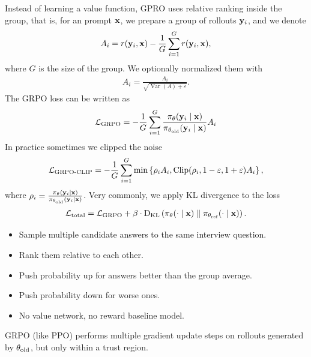 \documentclass[11pt]{article}  %
\begin{document}
Instead of learning a value function, GPRO uses relative ranking
inside the group, that is, for an prompt $\mathbf{x}$, we prepare a group of rollouts $\mathbf{y}_i$, and we denote 
\begin{align*}
  A_i = r(\mathbf{y}_i, \mathbf{x}) - \frac{1}{G}\sum_{i=1}^{G}r(\mathbf{y}_i, \mathbf{x}),
\end{align*}
where $G$ is the size of the group.
We optionally normalized them with 
\begin{align*}
  A_i = \frac{A_i}{\sqrt{\operatorname{Var}(A) + \varepsilon}}.
\end{align*}
The GRPO loss can be written as 
\begin{align*}
  \mathcal{L}_{\text{GRPO}} = -\frac{1}{G}\sum_{i=1}^{G}\frac{\pi_{\theta}(\mathbf{y}_i \mid \mathbf{x})}{\pi_{\theta_{\text{old}}}(\mathbf{y}_i \mid \mathbf{x})} A_i
\end{align*}
In practice sometimes we clipped the noise 
\begin{align*}
  \mathcal{L}_{\text{GRPO-CLIP}} = -\frac{1}{G}\sum_{i=1}^{G} \min\left\{ \rho_iA_i, \operatorname{Clip}(\rho_i, 1 - \varepsilon, 1 + \varepsilon)A_i \right\},
\end{align*}
where $\rho_i = \frac{\pi_{\theta}(\mathbf{y}_i \mid \mathbf{x})}{\pi_{\theta_{\text{old}}}(\mathbf{y}_i \mid \mathbf{x})}$.
Very commonly, we apply KL divergence to the loss 
\begin{align*}
  \mathcal{L}_{\text{total}} = \mathcal{L}_{\text{GRPO}} + \beta \cdot {\rm D}_{\text{KL}}\left( \pi_\theta(\cdot \mid \mathbf{x}) \parallel \pi_{\theta_{\text{ref}}}(\cdot \mid \mathbf{x}) \right).
\end{align*}

\begin{itemize}
  \item Sample multiple candidate answers to the same interview question.
  \item Rank them relative to each other.
  \item Push probability up for answers better than the group average.
  \item Push probability down for worse ones.
  \item No value network, no reward baseline model.
\end{itemize}
GRPO (like PPO) performs multiple gradient update steps on rollouts generated by $\theta_{\text{old}}$, but only within a trust region.
\end{document}
